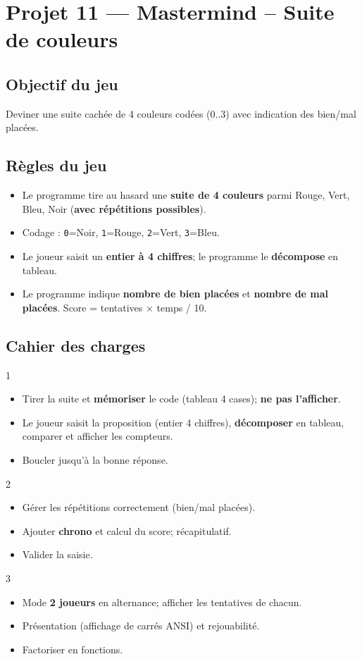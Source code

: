 \section{Projet 11 — Mastermind -- Suite de couleurs}

\subsection*{Objectif du jeu}
Deviner une suite cachée de 4 couleurs codées (0..3) avec indication des bien/mal placées.

\subsection*{Règles du jeu}
\begin{itemize}
  \item Le programme tire au hasard une \textbf{suite de 4 couleurs} parmi Rouge, Vert, Bleu, Noir (\textbf{avec répétitions possibles}).
  \item Codage : \texttt{0}=Noir, \texttt{1}=Rouge, \texttt{2}=Vert, \texttt{3}=Bleu.
  \item Le joueur saisit un \textbf{entier à 4 chiffres}; le programme le \textbf{décompose} en tableau.
  \item Le programme indique \textbf{nombre de bien placées} et \textbf{nombre de mal placées}. Score = tentatives × temps / 10.
\end{itemize}

\subsection*{Cahier des charges}
\begin{UPSTICahierDesCharges}{1}
\begin{itemize}
  \item Tirer la suite et \textbf{mémoriser} le code (tableau 4 cases); \textbf{ne pas l’afficher}.
  \item Le joueur saisit la proposition (entier 4 chiffres), \textbf{décomposer} en tableau, comparer et afficher les compteurs.
  \item Boucler jusqu’à la bonne réponse.
\end{itemize}
\end{UPSTICahierDesCharges}

\begin{UPSTICahierDesCharges}{2}
\begin{itemize}
  \item Gérer les répétitions correctement (bien/mal placées).
  \item Ajouter \textbf{chrono} et calcul du score; récapitulatif.
  \item Valider la saisie.
\end{itemize}
\end{UPSTICahierDesCharges}

\begin{UPSTICahierDesCharges}{3}
\begin{itemize}
  \item Mode \textbf{2 joueurs} en alternance; afficher les tentatives de chacun.
  \item Présentation (affichage de carrés ANSI) et rejouabilité.
  \item Factoriser en fonctions.
\end{itemize}
\end{UPSTICahierDesCharges}

